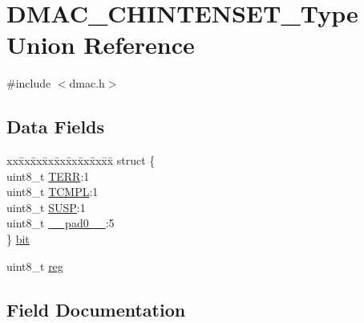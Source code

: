 \hypertarget{union_d_m_a_c___c_h_i_n_t_e_n_s_e_t___type}{}\section{D\+M\+A\+C\+\_\+\+C\+H\+I\+N\+T\+E\+N\+S\+E\+T\+\_\+\+Type Union Reference}
\label{union_d_m_a_c___c_h_i_n_t_e_n_s_e_t___type}


{\ttfamily \#include $<$dmac.\+h$>$}

\subsection*{Data Fields}
\begin{DoxyCompactItemize}
\item 
\begin{tabbing}
xx\=xx\=xx\=xx\=xx\=xx\=xx\=xx\=xx\=\kill
struct \{\\
\>uint8\_t \mbox{\hyperlink{union_d_m_a_c___c_h_i_n_t_e_n_s_e_t___type_aec94f800e27f13d8235935c375e2c7c2}{TERR}}:1\\
\>uint8\_t \mbox{\hyperlink{union_d_m_a_c___c_h_i_n_t_e_n_s_e_t___type_a6e8d058c4c4e02edbb191b6d2e19a8b6}{TCMPL}}:1\\
\>uint8\_t \mbox{\hyperlink{union_d_m_a_c___c_h_i_n_t_e_n_s_e_t___type_a5415253423cbe4ee0696caf4f3f25efa}{SUSP}}:1\\
\>uint8\_t \mbox{\hyperlink{union_d_m_a_c___c_h_i_n_t_e_n_s_e_t___type_a8b4eebe79ded0459acec2f4950102ba3}{\_\_pad0\_\_}}:5\\
\} \mbox{\hyperlink{union_d_m_a_c___c_h_i_n_t_e_n_s_e_t___type_a94173f0235f52712a4aa2b5d5c925b47}{bit}}\\

\end{tabbing}\item 
uint8\+\_\+t \mbox{\hyperlink{union_d_m_a_c___c_h_i_n_t_e_n_s_e_t___type_a9428adc9af4653a2050e2536b55dec8d}{reg}}
\end{DoxyCompactItemize}


\subsection{Field Documentation}
\mbox{\label{union_d_m_a_c___c_h_i_n_t_e_n_s_e_t___type_a8b4eebe79ded0459acec2f4950102ba3}} 
